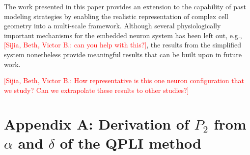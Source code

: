 \documentclass[]{interact}
\newcommand{\red}[1]{\textcolor{red}{[#1]}}
\begin{document}
The work presented in this paper provides an extension to the capability of past modeling strategies by enabling the realistic representation of complex cell geometry into a multi-scale framework. Although several physiologically important mechanisms for the embedded neuron system has been left out, e.g., \red{Sijia, Beth, Victor B.: can you help with this?}, the results from the simplified system nonetheless provide meaningful results that can be built upon in future work.

\red{Sijia, Beth, Victor B.: How representative is this one neuron configuration that we study? Can we extrapolate these results to other studies?} 



%
\newpage





\appendix
\section*{Appendix A: Derivation of $P_2$ from $\alpha$ and $\delta$ of the QPLI method}
\label{app:P2_derivation}
\end{document}

